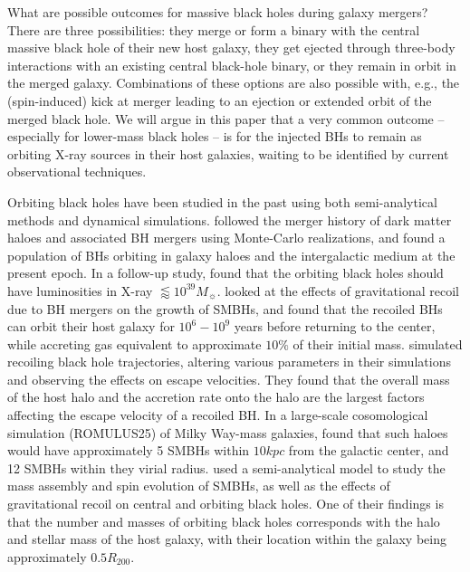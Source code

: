 \documentclass[fleqn,usenatbib,useAMS]{mnras}
\begin{document}
What are possible outcomes for massive black holes during galaxy mergers?  There are three possibilities: they merge or form a binary with the central massive black hole of their new host galaxy, they get ejected through three-body interactions with an existing central black-hole binary, or they remain in orbit in the merged galaxy.  Combinations of these options are also possible with, e.g., the (spin-induced) kick at merger leading to an ejection or extended orbit of the merged black hole. We will argue in this paper that a very common outcome -- especially for lower-mass black holes -- is for the injected BHs to remain as orbiting X-ray sources in their host galaxies, waiting to be identified by current observational techniques.

Orbiting black holes have been studied in the past using both semi-analytical methods and dynamical simulations.  \citet{2003ApJ...582..559V} followed the merger history of dark matter haloes and associated BH mergers using Monte-Carlo realizations, and found a population of BHs orbiting in galaxy haloes and the intergalactic medium at the present epoch.  In a follow-up study, \citet{2005MNRAS.358..913V} found that the orbiting black holes should have luminosities in X-ray $\lessapprox10^{39} M_{\sun}$.  \citet{2008MNRAS.390.1311B} looked at the effects of gravitational recoil due to BH mergers on the growth of SMBHs, and found that the recoiled BHs can orbit their host galaxy for $10^6-10^9$ years before returning to the center, while accreting gas equivalent to approximate $10{\%}$ of their initial mass.  \citet{2017MNRAS.472.1526C} simulated recoiling black hole trajectories, altering various parameters in their simulations and observing the effects on escape velocities.  They found that the overall mass of the host halo and the accretion rate onto the halo are the largest factors affecting the escape velocity of a recoiled BH.  In a large-scale cosomological simulation (ROMULUS25) of Milky Way-mass galaxies, \citet{2018ApJ...857L..22T} found that such haloes would have approximately 5 SMBHs within $10kpc$ from the galactic center, and 12 SMBHs within they virial radius.  \citet{2020MNRAS.495.4681I} used a semi-analytical model to study the mass assembly and spin evolution of SMBHs, as well as the effects of gravitational recoil on central and orbiting black holes.  One of their findings is that the number and masses of orbiting black holes corresponds with the halo and stellar mass of the host galaxy, with their location within the galaxy being approximately $0.5R_{200}$.
\end{document}
